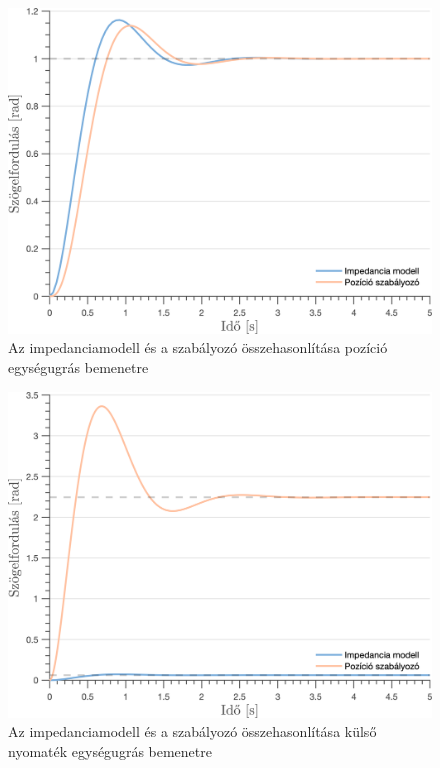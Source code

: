 \begin{figure}[H]
    \begin{center}
    \includegraphics[width=14cm]{images/observer_controller_pos_resp.png}
    \caption{Az impedanciamodell és a szabályozó összehasonlítása pozíció egységugrás bemenetre}\label{fig:observer_controller_pos_resp}
    \end{center}
\end{figure}
\begin{figure}[H]
    \begin{center}
    \includegraphics[width=14cm]{images/observer_controller_torque_resp.png}
    \caption{Az impedanciamodell és a szabályozó összehasonlítása külső nyomaték egységugrás bemenetre}\label{fig:observer_controller_torque_resp}
    \end{center}
\end{figure}

